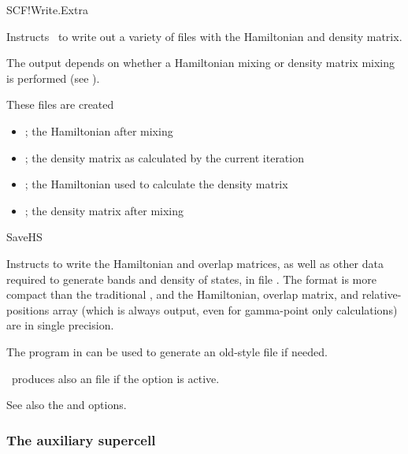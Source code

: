 \begin{fdflogicalF}{SCF!Write.Extra}

  Instructs \siesta\ to write out a variety of files with the
  Hamiltonian and density matrix.

  The output depends on whether a Hamiltonian mixing or density
  matrix mixing is performed (see ).
  
  These files are created
  \begin{itemize}
    \item {}; the Hamiltonian after
    mixing
    
    \item {}; the density matrix as calculated by the
    current iteration

    \item {}; the Hamiltonian used to calculate the
    density matrix
    
    \item {}; the density matrix after mixing

  \end{itemize}
  
\end{fdflogicalF}


\begin{fdflogicalF}{SaveHS}

  Instructs to write the Hamiltonian and overlap matrices, as well as
  other data required to generate bands and density of states, in file
  . The  format is more compact than the
  traditional , and the Hamiltonian, overlap matrix, and
  relative-positions array (which is always output, even for
  gamma-point only calculations) are in single precision.

  The program  in  can be used to
  generate an old-style  file if needed.

  \siesta\ produces also an  file if the  option
  is active.  


  See also the  and 
  options.

\end{fdflogicalF}

\subsubsection{The auxiliary supercell}

